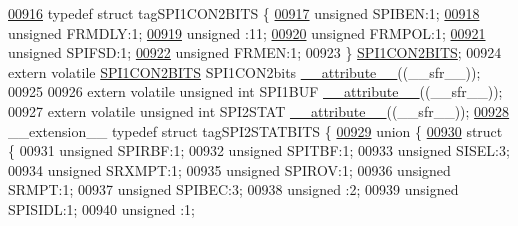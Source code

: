 \begin{DoxyCode}
\hypertarget{a00015_source_l00916}{}\hyperlink{a00014}{00916} \textcolor{keyword}{typedef} \textcolor{keyword}{struct }tagSPI1CON2BITS \{
\hypertarget{a00015_source_l00917}{}\hyperlink{a00014_a48f1b49d7589da2ee8c38cd6d820a542}{00917}   \textcolor{keywordtype}{unsigned} SPIBEN:1;
\hypertarget{a00015_source_l00918}{}\hyperlink{a00014_abc2e71af924cda26b91c8945dc68c1d4}{00918}   \textcolor{keywordtype}{unsigned} FRMDLY:1;
\hypertarget{a00015_source_l00919}{}\hyperlink{a00014_adf71f3d8410c1f1dbbc96680a92c49af}{00919}   \textcolor{keywordtype}{unsigned} :11;
\hypertarget{a00015_source_l00920}{}\hyperlink{a00014_a3f77b33ab0ae8182d247d8a75ce9795f}{00920}   \textcolor{keywordtype}{unsigned} FRMPOL:1;
\hypertarget{a00015_source_l00921}{}\hyperlink{a00014_aeb3b552a9f7c25bc1ae09655904e34cc}{00921}   \textcolor{keywordtype}{unsigned} SPIFSD:1;
\hypertarget{a00015_source_l00922}{}\hyperlink{a00014_a312bafba1b24944c8dfc39323e8fd4e9}{00922}   \textcolor{keywordtype}{unsigned} FRMEN:1;
00923 \} \hyperlink{a00014_d5/dae/a00767}{SPI1CON2BITS};
00924 \textcolor{keyword}{extern} \textcolor{keyword}{volatile} \hyperlink{a00014_d5/dae/a00767}{SPI1CON2BITS} SPI1CON2bits \hyperlink{a00015_a493c46f03454991ccc5aa7a6e1dfb2a7}{\_\_attribute\_\_}((\_\_sfr\_\_));
00925 
00926 \textcolor{keyword}{extern} \textcolor{keyword}{volatile} \textcolor{keywordtype}{unsigned} \textcolor{keywordtype}{int}  SPI1BUF \hyperlink{a00015_a493c46f03454991ccc5aa7a6e1dfb2a7}{\_\_attribute\_\_}((\_\_sfr\_\_));
00927 \textcolor{keyword}{extern} \textcolor{keyword}{volatile} \textcolor{keywordtype}{unsigned} \textcolor{keywordtype}{int}  SPI2STAT \hyperlink{a00015_a493c46f03454991ccc5aa7a6e1dfb2a7}{\_\_attribute\_\_}((\_\_sfr\_\_));
\hypertarget{a00015_source_l00928}{}\hyperlink{a00014}{00928} \_\_extension\_\_ \textcolor{keyword}{typedef} \textcolor{keyword}{struct }tagSPI2STATBITS \{
\hypertarget{a00015_source_l00929}{}\hyperlink{a00015}{00929}   \textcolor{keyword}{union }\{
\hypertarget{a00015_source_l00930}{}\hyperlink{a00015}{00930}     \textcolor{keyword}{struct }\{
00931       \textcolor{keywordtype}{unsigned} SPIRBF:1;
00932       \textcolor{keywordtype}{unsigned} SPITBF:1;
00933       \textcolor{keywordtype}{unsigned} SISEL:3;
00934       \textcolor{keywordtype}{unsigned} SRXMPT:1;
00935       \textcolor{keywordtype}{unsigned} SPIROV:1;
00936       \textcolor{keywordtype}{unsigned} SRMPT:1;
00937       \textcolor{keywordtype}{unsigned} SPIBEC:3;
00938       \textcolor{keywordtype}{unsigned} :2;
00939       \textcolor{keywordtype}{unsigned} SPISIDL:1;
00940       \textcolor{keywordtype}{unsigned} :1;

\end{DoxyCode}
